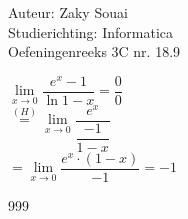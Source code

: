 \documentclass[a4paper]{article}
\begin{document}
  
\noindent \large Auteur: Zaky Souai \\
\noindent \large Studierichting:  Informatica\\
\noindent \large Oefeningenreeks 3C nr. 18.9\\

\bigskip

\normalsize

$\lim\limits_{x \to 0} \dfrac{e^x - 1}{\ln 1-x} = \dfrac{0}{0}$ \\
 
$\overset{(H)}{=} \lim\limits_{x \to 0} \dfrac{e^x}{\dfrac{-1}{1-x}}$ \\

$= \lim\limits_{x \to 0} \dfrac{e^x \cdot (1-x)}{-1} = -1$ \\


\begin{thebibliography}{999}
\end{thebibliography}
\end{document}
